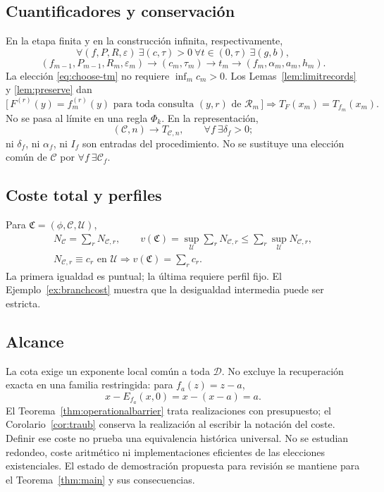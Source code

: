 \documentclass[11pt,a4paper]{article}
\numberwithin{equation}{section}
\theoremstyle{definition}
\theoremstyle{remark}
\newcommand{\DD}{\mathcal D}
\newcommand{\Rec}{\mathcal R}
\begin{document}
\subsection{Cuantificadores y conservación}
En la etapa finita y en la construcción infinita, respectivamente,
\[
\forall(f,P,R,\varepsilon)\ \exists(c,\tau)>0\ \forall t\in(0,\tau)\ \exists(g,b),
\]
\[
(f_{m-1},P_{m-1},R_m,\varepsilon_m)
\longrightarrow(c_m,\tau_m)\longrightarrow t_m
\longrightarrow(f_m,\alpha_m,a_m,h_m).
\]
La elección \eqref{eq:choose-tm} no requiere $\inf_m c_m>0$. Los Lemas~\ref{lem:limitrecords} y \ref{lem:preserve} dan
\[
\bigl[\,F^{(r)}(y)=f_m^{(r)}(y)\text{ para toda consulta }(y,r)\text{ de }\Rec_m\,\bigr]
\Longrightarrow T_F(x_m)=T_{f_m}(x_m).
\]
No se pasa al límite en una regla $\Phi_k$. En la representación,
\[
(\mathscr C,n)\longrightarrow T_{\mathscr C,n},\qquad
\forall f\ \exists\delta_f>0;
\]
ni $\delta_f$, ni $\alpha_f$, ni $I_f$ son entradas del procedimiento. No se sustituye una elección común de $\mathscr C$ por $\forall f\ \exists\mathscr C_f$.

\subsection{Coste total y perfiles}
Para $\mathfrak C=(\phi,\mathscr C,\mathcal U)$,
\[
\begin{gathered}
N_{\mathscr C}=\sum_rN_{\mathscr C,r},\qquad
v(\mathfrak C)=\sup_{\mathcal U}\sum_rN_{\mathscr C,r}
\le\sum_r\sup_{\mathcal U}N_{\mathscr C,r},\\
N_{\mathscr C,r}\equiv c_r\text{ en }\mathcal U
\Longrightarrow v(\mathfrak C)=\sum_r c_r.
\end{gathered}
\]
La primera igualdad es puntual; la última requiere perfil fijo. El Ejemplo~\ref{ex:branchcost} muestra que la desigualdad intermedia puede ser estricta.

\subsection{Alcance}
La cota exige un exponente local común a toda $\DD$. No excluye la recuperación exacta en una familia restringida: para $f_a(z)=z-a$,
\[
x-E_{f_a}(x,0)=x-(x-a)=a.
\]
El Teorema~\ref{thm:operationalbarrier} trata realizaciones con presupuesto; el Corolario~\ref{cor:traub} conserva la realización al escribir la notación del coste. Definir ese coste no prueba una equivalencia histórica universal. No se estudian redondeo, coste aritmético ni implementaciones eficientes de las elecciones existenciales. El estado de demostración propuesta para revisión se mantiene para el Teorema~\ref{thm:main} y sus consecuencias.
\end{document}
